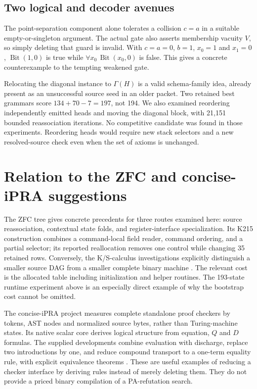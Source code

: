 \documentclass[11pt,letterpaper]{article}
\begin{document}
\subsection{Two logical and decoder avenues}

The point-separation component alone tolerates a collision $c=a$
in a suitable empty-or-singleton argument. The actual gate also
asserts membership vacuity $V$, so simply deleting that guard is
invalid. With $c=a=0$, $b=1$, $x_0=1$ and $x_1=0$,
$\operatorname{Bit}(1,0)$ is true while
$\forall x_0\,\operatorname{Bit}(x_0,0)$ is false. This gives
a concrete counterexample to the tempting weakened gate.

Relocating the diagonal instance to $\Gamma(H)$ is a valid
schema-family idea, already present as an unsuccessful source
seed in an older packet. Two retained best grammars score
$134+70-7=197$, not 194. We also examined reordering independently
emitted heads and moving the diagonal block, with 21,151
bounded reassociation iterations. No competitive candidate
was found in those experiments. Reordering heads would require
new stack selectors and a new resolved-source check even when
the set of axioms is unchanged.

\section{Relation to the ZFC and concise-iPRA suggestions}

The ZFC tree gives concrete precedents for three routes examined here:
source reassociation, contextual state folds, and register-interface
specialization. Its K215 construction combines a command-local field reader,
command ordering, and a partial selector; its reported reallocation removes
one control while changing 35 retained rows. Conversely, the K/S-calculus
investigations explicitly distinguish a smaller source DAG from a smaller
complete binary machine \cite{zfc}. The relevant cost is the allocated
table including initialization and helper routines. The 193-state runtime
experiment above is an especially direct example of why the bootstrap cost
cannot be omitted.

The concise-iPRA project measures complete standalone proof checkers by
tokens, AST nodes and normalized source bytes, rather than Turing-machine
states. Its native scalar core derives logical structure from equation,
$Q$ and $D$ formulas. The supplied developments combine evaluation with
discharge, replace two introductions by one, and reduce compound transport
to a one-term equality rule, with explicit equivalence theorems
\cite{concise}. These are useful examples of reducing a checker interface
by deriving rules instead of merely deleting them. They do not provide a
priced binary compilation of a PA-refutation search.
\end{document}
